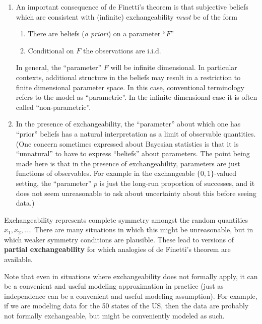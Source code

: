 \documentclass{article}
\begin{document}
\begin{enumerate}
\item An important consequence of de Finetti's theorem is that
  subjective beliefs which are consistent with (infinite)
  exchangeability {\it must} be of the form
\begin{enumerate}
\item There are beliefs ({\it a priori}) on a parameter ``$F$''
\item Conditional on $F$ the observations are i.i.d.
\end{enumerate}
In general, the ``parameter'' $F$ will be infinite dimensional.  In
particular contexts, additional structure in the beliefs may result in
a restriction to finite dimensional parameter space.  In this case,
conventional terminology refers to the model as ``parametric''.  In
the infinite dimensional case it is often called ``non-parametric''.
\item In the presence of exchangeability, the ``parameter'' about
  which one has ``prior'' beliefs has a natural interpretation as a
  limit of observable quantities.  (One concern sometimes expressed
about Bayesian statistics is that it is ``unnatural'' to have to express
``beliefs'' about parameters.  The point being made here is that in the
presence of exchangeability, parameters are just functions of
observables.  For example in the exchangeable $\{0,1\}$-valued setting,
the ``parameter'' $p$ is just the long-run proportion of successes, and
it does not seem unreasonable to ask about uncertainty about this before
seeing data.)
\end{enumerate}
\vskip 6mm
Exchangeability represents complete symmetry amongst the random
quantities $x_1,x_2,\ldots$.  There are many situations in which this
might be unreasonable, but in which weaker symmetry conditions are
plausible.  These lead to versions of {\bf partial exchangeability}
for which analogies of de Finetti's theorem are available.

Note that even in situations where exchangeability does not formally apply, 
it can be a convenient and useful modeling approximation in practice (just as independence can 
be a convenient and useful modeling assumption).
For example, if we are modeling data for the 50 states of the US, then the data
are probably not formally exchangeable, but might be conveniently modeled as such.
\end{document}
